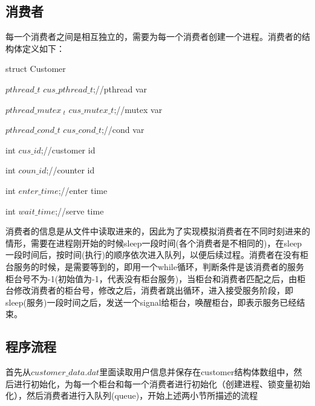 \documentclass[UTF8]{ctexart}
\begin{document}
\subsection{消费者}
每一个消费者之间是相互独立的，需要为每一个消费者创建一个进程。消费者的结构体定义如下：\par
\begin{algorithm}
\caption{struct Customer}
$pthread\_ t$ $ cus\_ pthread\_ t$;//pthread var\par
$pthread\_ mutex\ _t $ $cus\_ mutex\_ t$;//mutex var\par
$pthread\_ cond\_ t$ $ cus\_ cond\_ t$;//cond var\par
int $cus\_ id$;//customer id\par
int $coun\_ id$;//counter id\par
int $enter\_ time$;//enter time\par
int $wait\_ time$;//serve time\par
\end{algorithm}

消费者的信息是从文件中读取进来的，因此为了实现模拟消费者在不同时刻进来的情形，需要在进程刚开始的时候sleep一段时间(各个消费者是不相同的)，在sleep一段时间后，按时间(执行)的顺序依次进入队列，以便后续过程。消费者在没有柜台服务的时候，是需要等到的，即用一个while循环，判断条件是该消费者的服务柜台号不为-1(初始值为-1，代表没有柜台服务)，当柜台和消费者匹配之后，由柜台修改消费者的柜台号，修改之后，消费者跳出循环，进入接受服务阶段，即sleep(服务)一段时间之后，发送一个signal给柜台，唤醒柜台，即表示服务已经结束。\par

\subsection{程序流程}
首先从$customer\_ data.dat$里面读取用户信息并保存在customer结构体数组中，然后进行初始化，为每一个柜台和每一个消费者进行初始化（创建进程、锁变量初始化），然后消费者进行入队列(queue)，开始上述两小节所描述的流程\par
\end{document}
